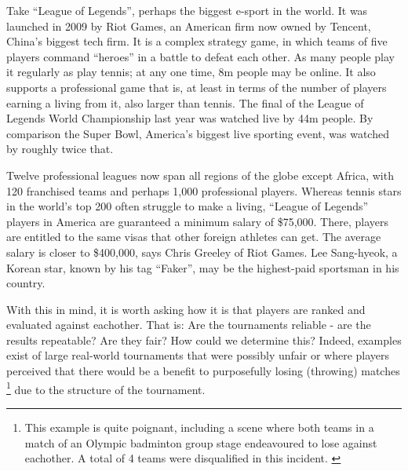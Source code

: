 \documentclass[a4,11pt,twoside,final,hidelinks]{article}
\newenvironment{itquote} {\begin{quoting}\color{darkgray}} {\end{quoting}}
\begin{document}
\begin{itquote}
Take “League of Legends”, perhaps the biggest e-sport in the world. It was
launched in 2009 by Riot Games, an American firm now owned by Tencent, China’s
biggest tech firm. It is a complex strategy game, in which teams of five players
command “heroes” in a battle to defeat each other. As many people play it
regularly as play tennis; at any one time, 8m people may be online. It also
supports a professional game that is, at least in terms of the number of players
earning a living from it, also larger than tennis. The final of the League of
Legends World Championship last year was watched live by 44m people. By
comparison the Super Bowl, America’s biggest live sporting event, was watched by
roughly twice that.

Twelve professional leagues now span all regions of the globe except Africa,
with 120 franchised teams and perhaps 1,000 professional players. Whereas tennis
stars in the world’s top 200 often struggle to make a living, “League of
Legends” players in America are guaranteed a minimum salary of \$75,000. There,
players are entitled to the same visas that other foreign athletes can get. The
average salary is closer to \$400,000, says Chris Greeley of Riot Games. Lee
Sang-hyeok, a Korean star, known by his tag “Faker”, may be the highest-paid
sportsman in his country.
\end{itquote}

With this in mind, it is worth asking how it is that players are ranked and
evaluated against eachother. That is: Are the tournaments reliable - are the
results repeatable? Are they fair? How could we determine this? Indeed, examples
exist of large real-world tournaments that were possibly unfair
\autocite{fifa-quant-unfairness}\autocite{fifa-risk-of-collusion} or where players
perceived that there would be a benefit to purposefully losing (throwing)
matches \autocite{Walker2012}\footnote{This example is quite poignant, including a scene
where both teams in a match of an Olympic badminton group stage endeavoured to
lose against eachother. A total of 4 teams were disqualified in this incident.
\autocite{double-elim-structure-efficacy-manipulation}} due to the structure of the
tournament.
\end{document}
